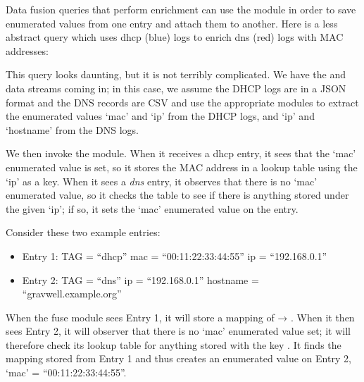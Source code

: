Data fusion queries that perform enrichment can use the  module
in order to save enumerated values
from one entry and attach them to another. Here is a less abstract query which uses dhcp (blue) logs to enrich dns (red) logs with MAC addresses:


This query looks daunting, but it is not terribly complicated. We have
the  and  data streams coming in; in this case, we assume the DHCP logs are in a JSON format and the DNS records are CSV and use the appropriate modules to extract the enumerated values `mac' and `ip' from the DHCP logs, and `ip' and `hostname' from the DNS logs.

We then invoke the  module. When it receives a dhcp entry, it sees that the `mac' enumerated value is set, so it stores the MAC address in a lookup table using the `ip' as a key. When it sees a \emph{dns} entry, it observes that there is no `mac' enumerated value, so it checks the table to see if there is anything stored under the given `ip'; if so, it sets the `mac' enumerated value on the entry.

Consider these two example entries:

\begin{itemize}
\item Entry 1: 
	\subitem TAG = ``dhcp''
	\subitem mac = ``00:11:22:33:44:55''
	\subitem ip = ``192.168.0.1''
\item Entry 2: 
	\subitem TAG = ``dns''
	\subitem ip = ``192.168.0.1''
	\subitem hostname = ``gravwell.example.org''
\end{itemize}

When the fuse module sees Entry 1, it will store a mapping of  → . When it then sees Entry 2, it will observer that there is no `mac' enumerated value set; it will therefore check its lookup table for anything stored with the key . It finds the mapping stored from Entry 1 and thus creates an enumerated value on Entry 2, `mac' = ``00:11:22:33:44:55''.

